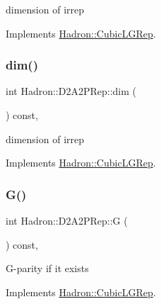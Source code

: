 dimension of irrep 

Implements \mbox{\hyperlink{structHadron_1_1CubicLGRep_a3acbaea26503ed64f20df693a48e4cdd}{Hadron\+::\+Cubic\+L\+G\+Rep}}.

\mbox{\label{structHadron_1_1D2A2PRep_a1b4aaa7427dc7ee8255807a8cfa19e61}} 
\subsubsection{\texorpdfstring{dim()}{dim()}\hspace{0.1cm}{\footnotesize\ttfamily [3/3]}}
{\footnotesize\ttfamily int Hadron\+::\+D2\+A2\+P\+Rep\+::dim (\begin{DoxyParamCaption}{ }\end{DoxyParamCaption}) const\hspace{0.3cm}{\ttfamily [inline]}, {\ttfamily [virtual]}}

dimension of irrep 

Implements \mbox{\hyperlink{structHadron_1_1CubicLGRep_a3acbaea26503ed64f20df693a48e4cdd}{Hadron\+::\+Cubic\+L\+G\+Rep}}.

\mbox{\label{structHadron_1_1D2A2PRep_aa0b832a72029fb46f658a4e726cd5cfb}} 
\subsubsection{\texorpdfstring{G()}{G()}\hspace{0.1cm}{\footnotesize\ttfamily [1/3]}}
{\footnotesize\ttfamily int Hadron\+::\+D2\+A2\+P\+Rep\+::G (\begin{DoxyParamCaption}{ }\end{DoxyParamCaption}) const\hspace{0.3cm}{\ttfamily [inline]}, {\ttfamily [virtual]}}

G-\/parity if it exists 

Implements \mbox{\hyperlink{structHadron_1_1CubicLGRep_ace26f7b2d55e3a668a14cb9026da5231}{Hadron\+::\+Cubic\+L\+G\+Rep}}.

\mbox{\label{structHadron_1_1D2A2PRep_aa0b832a72029fb46f658a4e726cd5cfb}} 
